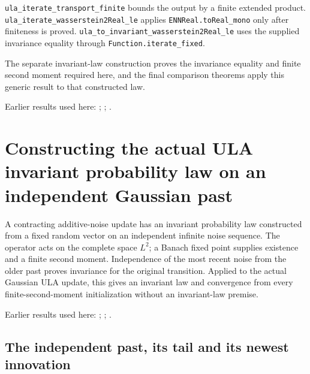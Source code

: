 \documentclass[11pt,a4paper]{report}
\newlength{\leancharwidth}
\newenvironment{leancode}{\par\smallskip\begingroup\ttfamily\footnotesize\raggedright
  \settowidth{\leancharwidth}{M}\setlength{\parskip}{0pt}\setlength{\parindent}{0pt}
  \frenchspacing}{\par\endgroup\smallskip}
\newcommand{\leanlabel}[1]{\par\smallskip\noindent{\small\bfseries #1}\par}
\begin{document}
\begin{leanbox}
\begin{leancode}
\end{leancode}
\leanlabel{How the Lean proof follows the argument}
\texttt{ula\_\allowbreak{}iterate\_\allowbreak{}transport\_\allowbreak{}finite} bounds the output by a finite extended product. \texttt{ula\_\allowbreak{}iterate\_\allowbreak{}wasserstein2\allowbreak{}Real\_\allowbreak{}le} applies \texttt{ENNReal.\allowbreak{}to\allowbreak{}Real\_\allowbreak{}mono} only after finiteness is proved. \texttt{ula\_\allowbreak{}to\_\allowbreak{}invariant\_\allowbreak{}wasserstein2\allowbreak{}Real\_\allowbreak{}le} uses the supplied invariance equality through \texttt{Function.\allowbreak{}iterate\_\allowbreak{}fixed}.



The separate invariant-law construction proves the invariance equality and finite second moment required here, and the final comparison theorems apply this generic result to that constructed law.
\end{leanbox}


Earlier results used here: \cite[Section~3.17.3]{LangevinLean2026ULASC}; \cite[Section~3.17.4]{LangevinLean2026ULASC}; \cite[Section~3.36.7]{LangevinLean2026ULASC}.
\section{\texorpdfstring{Constructing the actual ULA invariant probability law on an independent Gaussian past}{Constructing the actual ULA invariant probability law on an independent Gaussian past}}
\label{proof-module-WassersteinMixing-Invariant-lean}


A contracting additive-noise update has an invariant probability law constructed from a fixed random vector on an independent infinite noise sequence. The operator acts on the complete space \(L^2\); a Banach fixed point supplies existence and a finite second moment. Independence of the most recent noise from the older past proves invariance for the original transition. Applied to the actual Gaussian ULA update, this gives an invariant law and convergence from every finite-second-moment initialization without an invariant-law premise.



Earlier results used here: \cite[Section~3.13]{LangevinLean2026ULASC}; \cite[Section~3.36]{LangevinLean2026ULASC}; \cite[Section~3.21]{LangevinLean2026ULASC}.
\subsection{\texorpdfstring{The independent past, its tail and its newest innovation}{The independent past, its tail and its newest innovation}}
\label{report-step-WassersteinMixing-Invariant-lean-1}
\end{document}
